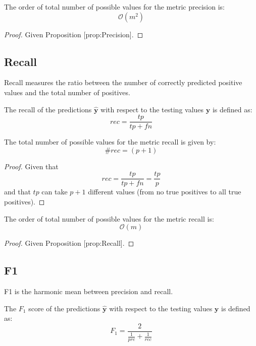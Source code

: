 \begin{corollary}
The order of total number of possible values for the metric precision is:
\[
\mathcal{O}\left(m^{2}\right)
\]
\end{corollary}
\begin{proof}
Given Proposition [prop:Precision].
\end{proof}

\subsection{Recall}

Recall measures the ratio between the number of correctly predicted positive values and the total number of positives.

\begin{definition}
The recall of the predictions $\hat{\mathbf{y}}$ with respect to the testing values $\mathbf{y}$ is defined as:
\[
rec=\frac{tp}{tp+fn}
\]
\end{definition}

\begin{proposition}
The total number of possible values for the metric recall is given by:
\[
\#rec=(p+1)
\]
\end{proposition}
\begin{proof}
Given that
\[
rec=\frac{tp}{tp+fn}=\frac{tp}{p}
\]
and that $tp$ can take $p+1$ different values (from no true positives to all true positives).
\end{proof}

\begin{corollary}
The order of total number of possible values for the metric recall is:
\[
\mathcal{O}\left(m\right)
\]
\end{corollary}
\begin{proof}
Given Proposition [prop:Recall].
\end{proof}

\subsection{F1}

F1 is the harmonic mean between precision and recall.

\begin{definition}
The $F_{1}$ score of the predictions $\hat{\mathbf{y}}$ with respect to the testing values $\mathbf{y}$ is defined as:
\[
F_{1}=\frac{2}{\frac{1}{pre}+\frac{1}{rec}}
\]
\end{definition}

